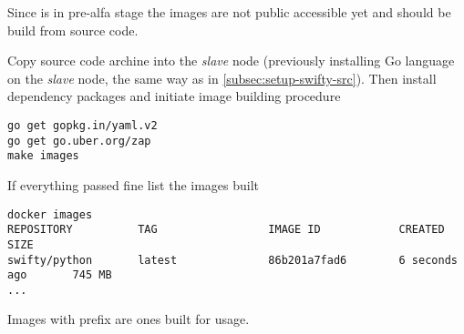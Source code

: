 Since  is in pre-alfa stage the images are not public
accessible yet and should be build from  source code.

Copy source code archine into the \emph{slave} node (previously
installing Go language on the \emph{slave} node, the same way
as in \ref{subsec:setup-swifty-src}). Then install dependency packages
and initiate image building procedure

\begin{lstlisting}
go get gopkg.in/yaml.v2
go get go.uber.org/zap
make images
\end{lstlisting}

If everything passed fine list the images built

\begin{lstlisting}
docker images
REPOSITORY          TAG                 IMAGE ID            CREATED             SIZE
swifty/python       latest              86b201a7fad6        6 seconds ago       745 MB
...
\end{lstlisting}

Images with  prefix are ones built for  usage.
